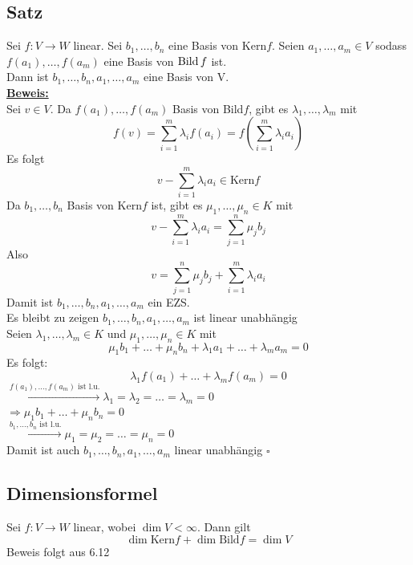 \subsection{Satz} %
\label{sub:satz}
Sei $f: V \to W$ linear. Sei $b_1, \ldots , b_n$ eine Basis von Kern$f$. Seien $a_1, \ldots , a_m \in V$ sodass 
$f(a_1), \ldots , f(a_m)$ eine Basis von $\operatorname{Bild} f$ ist. \\
Dann ist $b_1, \ldots , b_n , a_1, \ldots , a_m$ eine Basis von V.
\vspace{\baselineskip} \\
\underline{\textbf{Beweis:}} \\
Sei $v \in V$. Da $f(a_1), \ldots , f(a_m)$ Basis von Bild$f$, gibt es $\lambda_1 , \ldots , \lambda_m$ mit 
\[
	f(v)= \sum\limits_{i=1}^{m} \lambda_i f(a_i) = f \left(\sum\limits_{i=1}^{m} \lambda_i a_i\right)
\]
Es folgt
\[
	v - \sum\limits_{i=1}^{m} \lambda_i a_i \in \text{Kern}f
\]
Da $b_1 , \ldots , b_n$ Basis von Kern$f$ ist, gibt es $\mu_1, \ldots , \mu_n \in K$ mit
\[
	v- \sum\limits_{i=1}^{m} \lambda_i a_i = \sum\limits_{j=1}^{n} \mu_j b_j
\]
Also
\[
	v= \sum\limits_{j=1}^{n} \mu_j b_j + \sum\limits_{i=1}^{m} \lambda_i a_i
\]
Damit ist $b_1, \ldots , b_n, a_1, \ldots , a_m$ ein EZS. 
\vspace{\baselineskip} \\
Es bleibt zu zeigen $b_1, \ldots , b_n, a_1, \ldots , a_m$ ist linear unabhängig \\
Seien $\lambda_1 , \ldots , \lambda_m \in K$ und $\mu_1 , \ldots , \mu_n \in K$ mit
\[
	\mu_1 b_1 + \ldots + \mu_n b_n + \lambda_1 a_1 + \ldots + \lambda_m a_m =0
\]
Es folgt:
\[
	\lambda_1 f(a_1) + \ldots + \lambda_m f(a_m) =0
\]
$\xrightarrow{f(a_1), \ldots , f(a_m) \text{ ist l.u.}} \lambda_1 = \lambda_2 = \ldots = \lambda_m =0$ 
\vspace{8pt} \\
$\Longrightarrow \mu_1 b_1 + \ldots + \mu_n b_n =0$ 
\vspace{8pt} \\
$\xrightarrow{b_1, \ldots , b_n \text{ ist l.u.}} \mu_1 = \mu_2 = \ldots = \mu_n =0$
\vspace{8pt} \\
Damit ist auch $b_1, \ldots , b_n, a_1 , \ldots , a_m$ linear unabhängig \hfill $\square$

\subsection{Dimensionsformel} %
\label{sub:dimensionsformel}
Sei $f : V \to W$ linear, wobei $\dim V < \infty$. Dann gilt
\[
	\boxed{\dim \text{Kern}f + \dim \text{Bild}f = \dim V}
\]
Beweis folgt aus 6.12

